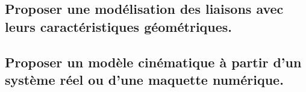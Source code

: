 \documentclass[10pt,fleqn]{book}
\newcommand{\repRel}{../..}
\newcommand{\repStyle}{\repRel/Style}
\newcommand{\td}{fichier_td}
\newcommand{\repExos}{\repRel/ExercicesCompetences}
\newcommand{\repExo}{dossier}
\begin{document}
\renewcommand{\repExo}{\repExos/B2_ProposerModele/B2_10_CartacteristiquesSolides/43_Cylindre}
\renewcommand{\td}{43_Cylindre}
\graphicspath{{\repStyle/png/}{\repExo/images/}}


\renewcommand{\repExo}{\repExos/B2_ProposerModele/B2_10_CartacteristiquesSolides/44_Disque}
\renewcommand{\td}{44_Disque}
\graphicspath{{\repStyle/png/}{\repExo/images/}}


\renewcommand{\repExo}{\repExos/B2_ProposerModele/B2_10_CartacteristiquesSolides/45_Disque}
\renewcommand{\td}{45_Disque}
\graphicspath{{\repStyle/png/}{\repExo/images/}}


\renewcommand{\repExo}{\repExos/B2_ProposerModele/B2_10_CartacteristiquesSolides/50_BancBalafre}
\renewcommand{\td}{50_BancBalafre}
\graphicspath{{\repStyle/png/}{\repExo/images/}}


\renewcommand{\repExo}{\repExos/B2_ProposerModele/B2_10_CartacteristiquesSolides/64_EPAS}
\renewcommand{\td}{64_EPAS}
\graphicspath{{\repStyle/png/}{\repExo/images/}}


\renewcommand{\repExo}{\repExos/B2_ProposerModele/B2_10_CartacteristiquesSolides/65_Eclipse}
\renewcommand{\td}{65_Eclipse}
\graphicspath{{\repStyle/png/}{\repExo/images/}}


\subsection{Proposer une modélisation des liaisons avec leurs caractéristiques géométriques.} 

\subsection{Proposer un modèle cinématique à partir d'un système réel ou d'une maquette numérique.} 

\renewcommand{\repExo}{\repExos/B2_ProposerModele/B2_12_ModeliserSchemasCinematiques/01_T}
\renewcommand{\td}{01_T}
\graphicspath{{\repStyle/png/}{\repExo/images/}}


\renewcommand{\repExo}{\repExos/B2_ProposerModele/B2_12_ModeliserSchemasCinematiques/02_R}
\renewcommand{\td}{02_R}
\graphicspath{{\repStyle/png/}{\repExo/images/}}


\renewcommand{\repExo}{\repExos/B2_ProposerModele/B2_12_ModeliserSchemasCinematiques/03_TT}
\renewcommand{\td}{03_TT}
\graphicspath{{\repStyle/png/}{\repExo/images/}}

\end{document}
